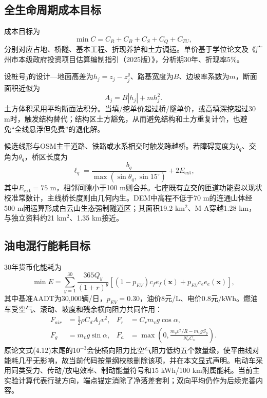 \documentclass[preprint,12pt]{elsarticle}
\begin{document}
\subsection{全生命周期成本目标}

成本目标为
\begin{equation}
\min C=C_R+C_B+C_S+C_Q+C_{TU},
\end{equation}
分别对应占地、桥隧、基本工程、折现养护和土方调运。单价基于学位论文及《广州市本级政府投资项目估算编制指引（2025版）》\cite{guangzhou2025}，分析期30年、折现率5\%。

设桩号$j$的设计—地面高差为$h_j=z_j-z^g_j$、路基宽度为$B$、边坡率系数为$m$，断面面积近似为
\begin{equation}
A_j=B|h_j|+mh_j^2.
\end{equation}
土方体积采用平均断面法积分。当填/挖单价超过桥/隧单价，或高填深挖超过30 m时，触发结构替代；结构区土方豁免，从而避免结构和土方重复计价，也避免“全线悬浮但免费”的退化解。

候选线形与OSM主干道路、铁路或水系相交时触发跨越桥。若障碍宽度为$b_q$、交角为$\theta_q$，桥区长度为
\begin{equation}
\ell_q=\frac{b_q}{\max(\sin\theta_q,\sin15^\circ)}+2E_{\mathrm{ext}},
\end{equation}
其中$E_{\mathrm{ext}}=75$ m，相邻间隙小于100 m则合并。七座既有立交的匝道功能费以现状校准常数计，主线桥长度则由几何内生。DEM中高程不低于70 m的连通山体经500 m闭运算形成白云山生态强制隧道区；其面积19.2 km$^2$、M-A穿越1.28 km，与独立资料约21 km$^2$、1.35 km接近。

\subsection{油电混行能耗目标}

30年货币化能耗为
\begin{equation}
\min E=\sum_{y=1}^{30}\frac{365Q_y}{(1+r)^y}
\left[(1-p_{EV})c_fe_f(\bm x)+p_{EV}c_ee_e(\bm x)\right],
\end{equation}
其中基准AADT为30,000辆/日，$p_{EV}=0.30$，油价8元/L、电价0.8元/kWh。燃油车受空气、滚动、坡度和残余横向阻力共同作用：
\begin{align}
F_{air}&=\tfrac12\rho C_dA_fv^2, & F_r&=C_rm_vg\cos\alpha,\\
F_g&=m_vg\sin\alpha, &
F_a&=\max\left(0,\frac{m_vv^2/R-m_vgS_p}{N_vC_s}\right).
\end{align}
原论文式(4.12)末尾的$10^{-3}$会使横向阻力比空气阻力低约五个数量级，使平曲线对能耗几乎无影响，故当前代码按量纲校核删除该项，并在本文显式声明。电动车采用同类受力、传动/放电效率、制动能量符号和15 kWh/100 km附属能耗。当前主实验计算代表行驶方向，端点锚定消除了净落差套利；双向平均仍作为后续完善内容。
\end{document}
